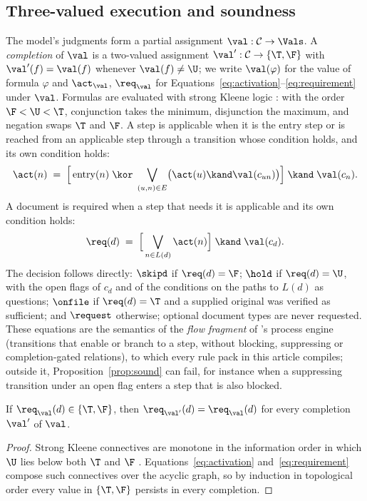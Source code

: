 \subsection{Three-valued execution and soundness}
\label{sec:kleene}

The model's judgments form a partial assignment $\val:\mathcal{C}\to\Vals$. A \emph{completion} of $\val$ is a two-valued assignment $\val':\mathcal{C}\to\{\T,\F\}$ with $\val'(f)=\val(f)$ whenever $\val(f)\neq\U$; we write $\val(\varphi)$ for the value of formula $\varphi$ and $\act_\val$, $\req_\val$ for Equations~\eqref{eq:activation}--\eqref{eq:requirement} under $\val$. Formulas are evaluated with strong Kleene logic \cite{kleene1952introduction}: with the order $\F<\U<\T$, conjunction takes the minimum, disjunction the maximum, and negation swaps $\T$ and $\F$. A step is applicable when it is the entry step or is reached from an applicable step through a transition whose condition holds, and its own condition holds:
\begin{equation}
\act(n) \;=\; \Bigl[\,\mathrm{entry}(n)\;\kor\;\bigvee_{(u,n)\in E}\bigl(\act(u)\kand\val(c_{un})\bigr)\Bigr]\;\kand\;\val(c_n).
\label{eq:activation}
\end{equation}
A document is required when a step that needs it is applicable and its own condition holds:
\begin{equation}
\req(d) \;=\; \Bigl[\,\bigvee_{n\in L(d)}\act(n)\Bigr]\;\kand\;\val(c_d).
\label{eq:requirement}
\end{equation}
The decision follows directly: $\skipd$ if $\req(d)=\F$; $\hold$ if $\req(d)=\U$, with the open flags of $c_d$ and of the conditions on the paths to $L(d)$ as questions; $\onfile$ if $\req(d)=\T$ and a supplied original was verified as sufficient; and $\request$ otherwise; optional document types are never requested. These equations are the semantics of the \emph{flow fragment} of \casepath's process engine (transitions that enable or branch to a step, without blocking, suppressing or completion-gated relations), to which every rule pack in this article compiles; outside it, Proposition~\ref{prop:sound} can fail, for instance when a suppressing transition under an open flag enters a step that is also blocked.

\begin{proposition}[Soundness]
\label{prop:sound}
If $\req_\val(d)\in\{\T,\F\}$, then $\req_{\val'}(d)=\req_\val(d)$ for every completion $\val'$ of $\val$.
\end{proposition}
\begin{proof}
Strong Kleene connectives are monotone in the information order in which $\U$ lies below both $\T$ and $\F$ \cite{kleene1952introduction}. Equations~\eqref{eq:activation} and~\eqref{eq:requirement} compose such connectives over the acyclic graph, so by induction in topological order every value in $\{\T,\F\}$ persists in every completion.
\end{proof}

